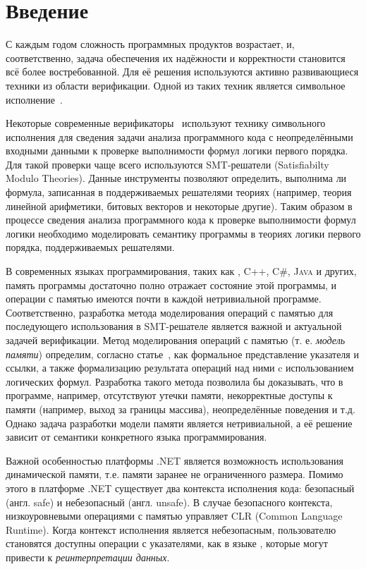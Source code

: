 \section*{Введение}
С каждым годом сложность программных продуктов возрастает, и, соответственно, задача обеспечения их надёжности и корректности становится всё более востребованной. Для её решения используются активно развивающиеся техники из области верификации. Одной из таких техник является символьное исполнение~\cite{wenenhancing, li2014symbolic}.

Некоторые современные верификаторы~\cite{sethu2018systems, wang2017dependence, sharma2018veritesting} используют технику символьного исполнения для сведения задачи анализа программного кода с неопределёнными входными данными к проверке выполнимости формул логики первого порядка. Для такой проверки чаще всего используются SMT-решатели (Satisfiabilty Modulo Theories). Данные инструменты позволяют определить, выполнима ли формула, записанная в поддерживаемых
решателями теориях (например, теория линейной арифметики, битовых векторов и некоторые другие). Таким образом в процессе сведения анализа программного кода к проверке выполнимости формул логики необходимо моделировать семантику программы в теориях логики первого порядка, поддерживаемых решателями.

В современных языках программирования, таких как \clang{}, \textsc{C++}, \textsc{C\#}, \textsc{Java} и других, память программы достаточно полно отражает состояние этой программы, и операции с памятью имеются почти в каждой нетривиальной программе. Соответственно, разработка метода моделирования операций с памятью для последующего использования в SMT-решателе является важной и актуальной задачей верификации. Метод моделирования операций с памятью (т. е. \emph{модель памяти}) определим, согласно статье~\cite{mandrik}, как формальное представление указателя и ссылки, а также формализацию результата операций над ними c использованием логических формул. Разработка такого метода позволила бы доказывать, что в программе, например, отсутствуют утечки памяти, некорректные доступы к памяти (например, выход за границы массива), неопределённые поведения и т.д. Однако задача разработки модели памяти является нетривиальной, а её решение зависит от семантики конкретного языка программирования.

Важной особенностью платформы .NET является возможность использования динамической памяти, т.е. памяти заранее не ограниченного размера. Помимо этого в платформе .NET существует два контекста исполнения кода: безопасный (англ. safe) и небезопасный (англ. unsafe). В случае безопасного контекста, низкоуровневыми операциями с памятью управляет \textsc{CLR} (Common Language Runtime). Когда контекст исполнения является небезопасным, пользователю становятся доступны операции с указателями, как в языке \clang{}, которые могут привести к \emph{реинтерпретации данных}.

